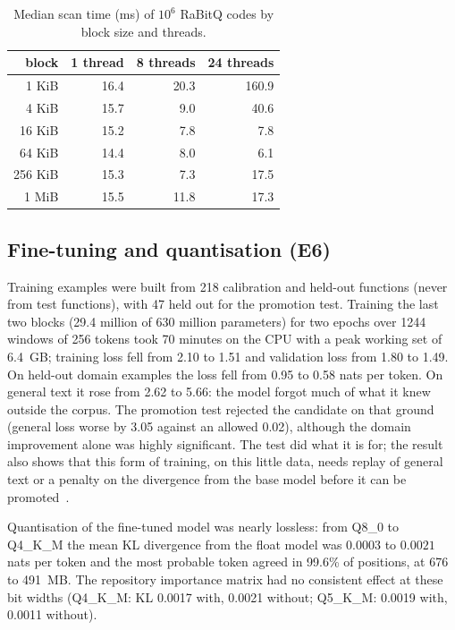 \documentclass[10pt,twocolumn]{article}
\theoremstyle{definition}
\theoremstyle{remark}
\begin{document}
\begin{table}[t]\centering\small
\caption{Median scan time (ms) of $10^6$ RaBitQ codes by block size and threads.}\label{tab:scan}
\begin{tabular}{rrrr}\toprule
block & 1 thread & 8 threads & 24 threads \\\midrule
1 KiB & 16.4 & 20.3 & 160.9 \\
4 KiB & 15.7 & 9.0 & 40.6 \\
16 KiB & 15.2 & 7.8 & 7.8 \\
64 KiB & 14.4 & 8.0 & 6.1 \\
256 KiB & 15.3 & 7.3 & 17.5 \\
1 MiB & 15.5 & 11.8 & 17.3 \\\bottomrule
\end{tabular}
\end{table}

\subsection{Fine-tuning and quantisation (E6)}
Training examples were built from 218 calibration and held-out functions (never from test functions), with 47 held out for the promotion test.
Training the last two blocks (29.4 million of 630 million parameters) for two epochs over 1244 windows of 256 tokens took 70 minutes on the CPU with a peak working set of 6.4~GB; training loss fell from 2.10 to 1.51 and validation loss from 1.80 to 1.49.
On held-out domain examples the loss fell from 0.95 to 0.58 nats per token.
On general text it rose from 2.62 to 5.66: the model forgot much of what it knew outside the corpus.
The promotion test rejected the candidate on that ground (general loss worse by 3.05 against an allowed 0.02), although the domain improvement alone was highly significant.
The test did what it is for; the result also shows that this form of training, on this little data, needs replay of general text or a penalty on the divergence from the base model before it can be promoted~\cite{kirkpatrick2017ewc,biderman2024lora}.

Quantisation of the fine-tuned model was nearly lossless: from Q8\_0 to Q4\_K\_M the mean KL divergence from the float model was $0.0003$ to $0.0021$ nats per token and the most probable token agreed in 99.6\% of positions, at 676 to 491~MB.
The repository importance matrix had no consistent effect at these bit widths (Q4\_K\_M: KL 0.0017 with, 0.0021 without; Q5\_K\_M: 0.0019 with, 0.0011 without).
\end{document}
